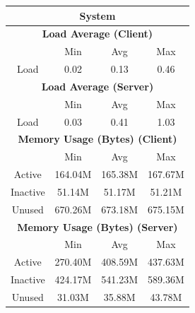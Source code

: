 \documentclass[11pt,a4paper,headinclude=false,footinclude=false]{scrreprt}
\begin{document}
\begin{table}[H]
\centering
    \begin{tabular}{||c|c|c|c|c|c|c||}
    \hline
    \multicolumn{7}{|c|}{\textbf{System}} \\
    \hline
    \multicolumn{7}{|c|}{\textbf{Load Average (Client)}} \\
    \hline\hline
      & \multicolumn{2}{|c|}{Min} & \multicolumn{2}{|c|}{Avg} & \multicolumn{2}{|c|}{Max} \\
    \hline
    Load & \multicolumn{2}{|c|}{0.02} & \multicolumn{2}{|c|}{0.13} & \multicolumn{2}{|c|}{0.46} \\
    \hline\hline
    \multicolumn{7}{|c|}{\textbf{Load Average (Server)}} \\
    \hline\hline
      & \multicolumn{2}{|c|}{Min} & \multicolumn{2}{|c|}{Avg} & \multicolumn{2}{|c|}{Max} \\
    \hline
    Load & \multicolumn{2}{|c|}{0.03} & \multicolumn{2}{|c|}{0.41} & \multicolumn{2}{|c|}{1.03} \\
    \hline\hline
    \multicolumn{7}{|c|}{\textbf{Memory Usage (Bytes) (Client)}} \\
    \hline\hline
      & \multicolumn{2}{|c|}{Min} & \multicolumn{2}{|c|}{Avg} & \multicolumn{2}{|c|}{Max} \\
    \hline
    Active & \multicolumn{2}{|c|}{164.04M} & \multicolumn{2}{|c|}{165.38M} & \multicolumn{2}{|c|}{167.67M} \\
    \hline
    Inactive & \multicolumn{2}{|c|}{51.14M} & \multicolumn{2}{|c|}{51.17M} & \multicolumn{2}{|c|}{51.21M} \\
    \hline
    Unused & \multicolumn{2}{|c|}{670.26M} & \multicolumn{2}{|c|}{673.18M} & \multicolumn{2}{|c|}{675.15M} \\
    \hline\hline
    \multicolumn{7}{|c|}{\textbf{Memory Usage (Bytes) (Server)}} \\
    \hline\hline
      & \multicolumn{2}{|c|}{Min} & \multicolumn{2}{|c|}{Avg} & \multicolumn{2}{|c|}{Max} \\
    \hline
    Active & \multicolumn{2}{|c|}{270.40M} & \multicolumn{2}{|c|}{408.59M} & \multicolumn{2}{|c|}{437.63M} \\
    \hline
    Inactive & \multicolumn{2}{|c|}{424.17M} & \multicolumn{2}{|c|}{541.23M} & \multicolumn{2}{|c|}{589.36M} \\
    \hline
    Unused & \multicolumn{2}{|c|}{31.03M} & \multicolumn{2}{|c|}{35.88M} & \multicolumn{2}{|c|}{43.78M} \\
    \hline\hline

\end{tabular}
\end{table}
\end{document}
